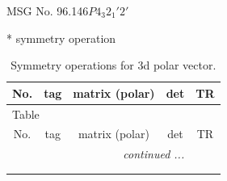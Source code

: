 \documentclass[fleqn,8pt]{jsarticle}
\begin{document}
\setcounter{MaxMatrixCols}{32}

\renewcommand{\tablename}{Table~}
\renewcommand{\figurename}{Figure~}
\begin{center}
\LARGE
MSG No. 96.146\quad$P4_{3}2_{1}'2'$
\end{center}
* symmetry operation
\renewcommand{\arraystretch}{1.3}
\begin{longtable}{ccccc}
\caption{Symmetry operations for 3d polar vector.}
 \\
 \hline \hline
No. & tag & matrix (polar) & det & TR \\ \hline \endfirsthead

\multicolumn{4}{l}{\tablename\ \thetable{}} \\
 \hline \hline
No. & tag & matrix (polar) & det & TR \\ \hline \endhead

 \hline \hline
\multicolumn{4}{r}{\footnotesize\it continued ...} \\ \endfoot

 \hline \hline
\multicolumn{4}{r}{} \\ \endlastfoot


\end{longtable}
\end{document}
